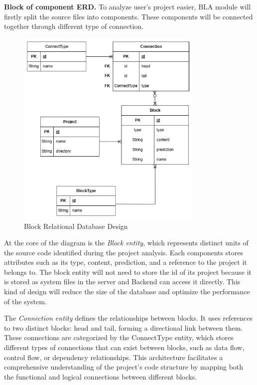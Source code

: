 \hspace{0.5cm}\textbf{Block of component ERD.}	To analyze user’s project easier, BLA module will firstly split the source files into components. These components will be connected together through different type of connection. 

\begin{figure}[H]
	\centering
	\includegraphics[width=0.8\textwidth]{images/DB block design.drawio.png}
	\caption{Block Relational Database Design}
	\label{fig:block-erd}
\end{figure}

\hspace{0.5cm}At the core of the diagram is the \textit{Block entity}, which represents distinct units of the source code identified during the project analysis. Each components stores attributes such as its type, content, prediction, and a reference to the project it belongs to. The block entity will not need to store the id of its project because it is stored as system files in the server and Backend can access it directly. This kind of design will reduce the size of the database and optimize the performance of the system.

\hspace{0.5cm} The \textit{Connection entity} defines the relationships between blocks. It uses references to two distinct blocks: head and tail, forming a directional link between them. These connections are categorized by the ConnectType entity, which stores different types of connections that can exist between blocks, such as data flow, control flow, or dependency relationships. This architecture facilitates a comprehensive understanding of the project's code structure by mapping both the functional and logical connections between different blocks.

